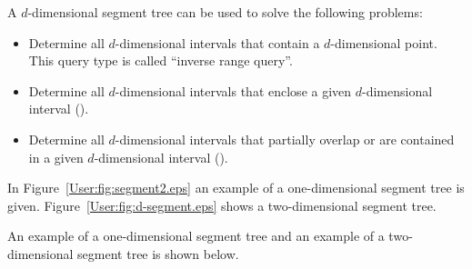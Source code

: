 A $d$-dimensional segment tree can be used to solve the following problems:
\begin{itemize}
\item Determine all $d$-dimensional intervals that contain a
  $d$-dimensional point. This query type is called ``inverse
  range query''.
  \item Determine all $d$-dimensional intervals that enclose a
    given $d$-dimensional interval
    ().
  \item Determine all $d$-dimensional intervals that partially overlap or are
    contained in a given $d$-dimensional interval ().
\end{itemize}

\begin{ccTexOnly}
In Figure~\ref{User:fig:segment2.eps} an example of a one-dimensional segment tree
is
given. Figure~\ref{User:fig:d-segment.eps} shows a two-dimensional
segment tree.
\end{ccTexOnly}

\begin{ccHtmlOnly}
An example of a one-dimensional segment tree and an example
of a two-dimensional
segment tree is shown below.
\end{ccHtmlOnly}

